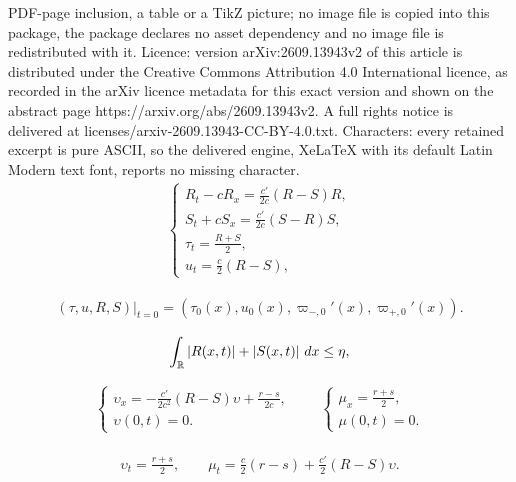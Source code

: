 \documentclass[10pt,a4paper]{amsart}
\newcommand{\dps}{\displaystyle}
\newcommand{\fr}{\frac}
\begin{document}
PDF-page inclusion, a table or a TikZ picture; no image file is copied into this package, the package declares no asset dependency and no image file is redistributed with it. Licence: version arXiv:2609.13943v2 of this article is distributed under the Creative Commons Attribution 4.0 International licence, as recorded in the arXiv licence metadata for this exact version and shown on the abstract page https://arxiv.org/abs/2609.13943v2. A full rights notice is delivered at licenses/arxiv-2609.13943-CC-BY-4.0.txt. Characters: every retained excerpt is pure ASCII, so the delivered engine, XeLaTeX with its default Latin Modern text font, reports no missing character.
\begin{align}\label{2.9}
\left\{
\begin{array}{l}
\dps R_t-cR_x=\fr{c'}{2c}(R-S)R, \\[8pt]
\dps S_t+cS_x=\fr{c'}{2c}(S-R)S, \\[8pt]
\dps \tau_t=\fr{R+S}{2}, \\[8pt]
\dps u_t=\fr{c}{2}(R-S),
\end{array}
\right.
\end{align}

\begin{align}\label{2.9a}
(\tau, u, R, S)|_{t=0}=(\tau_0(x), u_0(x), \varpi_{-,0}'(x), \varpi_{+,0}'(x)).
\end{align}

\begin{align}\label{6.1a}
\int_{\mathbb{R}}|R(x, t)|+|S(x, t)|\ {\rm d}x\leq  \eta,
\end{align}

\begin{align}\label{6.3}
\left\{
\begin{array}{l}
\dps \upsilon_x=-\fr{c'}{2c^2}(R-S)\upsilon +\fr{r-s}{2c}, \\[6pt]
\dps \upsilon(0,t)=0.
\end{array}
\right.
\qquad
\left\{
\begin{array}{l}
\dps \mu_x=\fr{r+s}{2}, \\[6pt]
\dps \mu(0,t)=0.
\end{array}
\right.
\end{align}

\begin{align}\label{6.4}
\begin{split}
\upsilon_t=\fr{r+s}{2},\qquad \mu_t=\fr{c}{2}(r-s)+\fr{c'}{2}(R-S)\upsilon.
\end{split}
\end{align}
\end{document}
